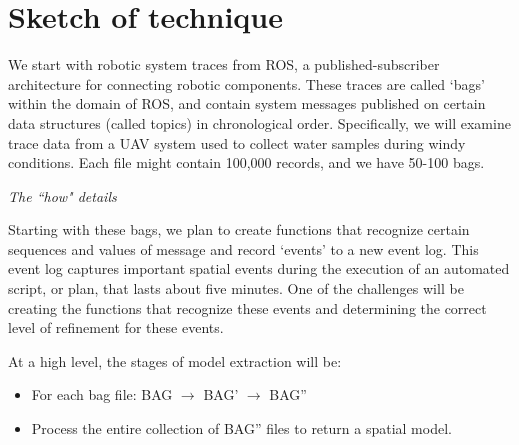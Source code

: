 \documentclass{article}
\begin{document}
\section{Sketch of technique}

We start with robotic system traces from ROS, a published-subscriber architecture for connecting robotic components.  
These traces are called `bags' within the domain of ROS, and contain system messages published on certain data structures (called topics) in chronological order.
Specifically, we will examine trace data from a UAV system used to collect water samples during windy conditions.
Each file might contain 100,000 records, and we have 50-100 bags.

\emph{The ``how" details}

Starting with these bags, we plan to create functions that recognize certain sequences and values of message and record `events' to a new event log.
This event log captures important spatial events during the execution of an automated script, or plan, that lasts about five minutes.
One of the challenges will be creating the functions that recognize these events and determining the correct level of refinement for these events.

At a high level, the stages of model extraction will be:

\begin{itemize}
  \item For each bag file: BAG $\rightarrow$ BAG' $\rightarrow$ BAG'' 

  \item Process the entire collection of BAG'' files to return a spatial model.
\end{itemize}

\end{document}

